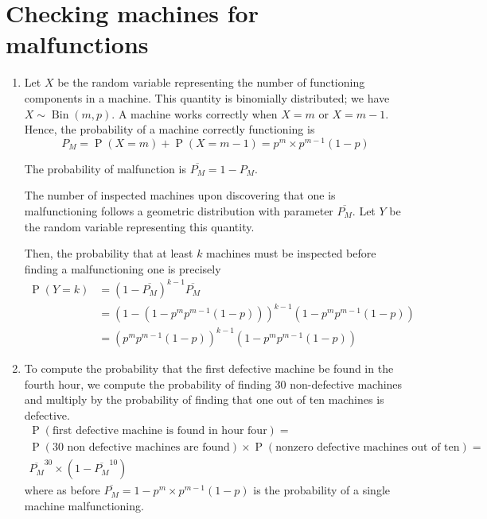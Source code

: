 \documentclass[11pt,letterpaper]{article}
\newcommand{\question}{\section}
\newcommand{\parens}[1]{\left(#1\right)}
\newcommand{\compl}[1]{\overline{#1}}
\DeclareMathOperator{\Prob}{P}
\renewcommand{\P}[1]{\Prob{\parens{#1}}}
\DeclareMathOperator{\BinOp}{Bin}
\newcommand{\Bin}[2]{\BinOp{\parens{#1,#2}}}
\begin{document}
\question{Checking machines for malfunctions}

\begin{enumerate}
    \item
        Let $X$ be the random variable representing the number of functioning
        components in a machine.
        This quantity is binomially distributed; we have $X \sim \Bin{m}{p}$.
        A machine works correctly when $X = m$ or $X = m-1$. Hence, the
        probability of a machine correctly functioning is
        \begin{equation*}
            P_M = \P{X = m} + \P{X = m-1} = p^m \times p^{m-1}(1-p)
        \end{equation*}

        The probability of malfunction is $\compl{P_M} = 1 - P_M$.

        The number of inspected machines upon discovering that one is
        malfunctioning follows a geometric distribution with parameter
        $\compl{P_M}$.
        Let $Y$ be the random variable representing this quantity.

        Then, the probability that at least $k$ machines must be inspected
        before finding a malfunctioning one is precisely
        \begin{align*}
            \P{Y = k}
            &= (1 - \compl{P_M})^{k-1} \compl{P_M} \\
            &= \parens{1 - (1 - p^m p^{m-1}(1-p))}^{k-1}
                (1 - p^m p^{m-1}(1-p)) \\
            &= \parens{p^m p^{m-1} (1-p)}^{k-1} (1 - p^m p^{m-1}(1-p))
        \end{align*}

    \item
        To compute the probability that the first defective machine be found in
        the fourth hour, we compute the probability of finding $30$
        non-defective machines and multiply by the probability of finding that
        one out of ten machines is defective.
        \begin{align*}
            \P{\text{first defective machine is found in hour four}} =\\
            \P{\text{30 non defective machines are found}} \times
            \P{\text{nonzero defective machines out of ten}} = \\
            \compl{P_M}^{30} \times \parens{
                1 - \compl{P_M}^{10}
            }
        \end{align*}
        where as before $\compl{P_M} = 1 - p^m \times p^{m-1}(1-p)$ is the
        probability of a single machine malfunctioning.
\end{enumerate}
\end{document}
